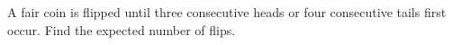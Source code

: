 A fair coin is flipped until three consecutive heads or four consecutive tails first occur. Find the expected number of flips.

